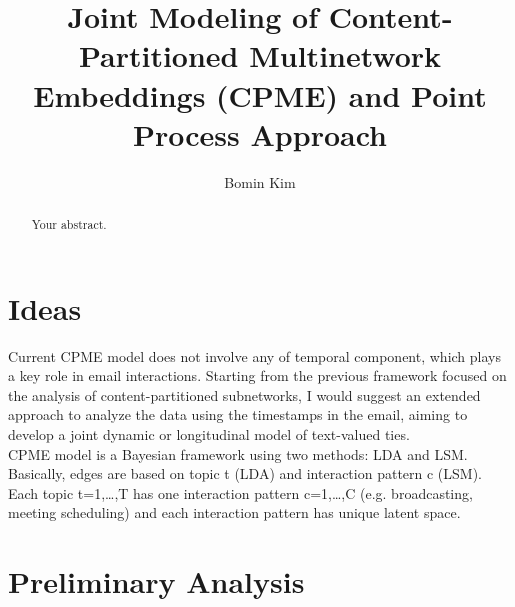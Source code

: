 \documentclass[a4paper]{article}
\title{Joint Modeling of Content-Partitioned Multinetwork Embeddings (CPME) and Point Process Approach}
\author{Bomin Kim}
\begin{document}
\maketitle

\begin{abstract}
Your abstract.
\end{abstract}

\section{Ideas}
Current CPME model does not involve any of temporal component, which plays a key role in email interactions. Starting from the previous framework focused on the analysis of content-partitioned subnetworks, I would suggest an extended approach to analyze the data using the timestamps in the email, aiming to develop a joint dynamic or longitudinal model of text-valued ties.\\ \newline
 CPME model is a Bayesian framework using two methods: LDA and LSM. Basically, edges are based on topic t (LDA) and interaction pattern c (LSM). 
Each topic t=1,…,T has one interaction pattern c=1,…,C (e.g. broadcasting, meeting scheduling) and each interaction pattern has unique latent space. 
\newpage
\section{Preliminary Analysis}
\end{document}
